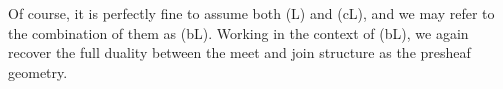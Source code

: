 \documentclass[12pt]{amsart}
\theoremstyle{definition}
\newtheorem{definition}[theorem]{Definition}
\newcommand{\mbb}[1]{\mathbb{#1}}
\newcommand{\I}{\mbb I}
\newcommand{\ms}[1]{\mathsf{#1}}
\newcommand{\scomp}[2]{\{\,#1\mid#2\,\}}
\newcommand{\hook}{\hookrightarrow}
\begin{document}
Of course, it is perfectly fine to assume both (L) and (cL), and we may refer to the combination of them as (bL). Working in the context of (bL), we again recover the full duality between the meet and join structure as the presheaf geometry.






\end{document}
